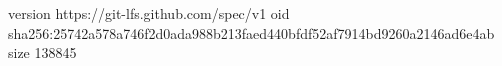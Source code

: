 version https://git-lfs.github.com/spec/v1
oid sha256:25742a578a746f2d0ada988b213faed440bfdf52af7914bd9260a2146ad6e4ab
size 138845
